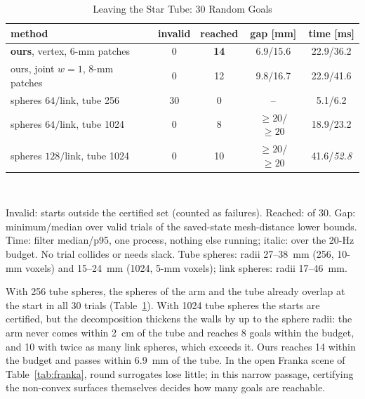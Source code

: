 \documentclass[journal]{IEEEtran}
\theoremstyle{definition}
\begin{document}
\begin{table}[t]
\caption{Leaving the Star Tube: 30 Random Goals}
\label{tab:spheres}
\centering\footnotesize
\setlength{\tabcolsep}{2pt}
\begin{tabular}{lcccc}
\toprule
method & invalid & reached & gap [mm] & time [ms]\\
\midrule
\textbf{ours}, vertex, 6-mm patches & 0 & \textbf{14} & 6.9/15.6 & 22.9/36.2\\
ours, joint $w=1$, 8-mm patches & 0 & 12 & 9.8/16.7 & 22.9/41.6\\
spheres $64/$link, tube 256 & 30 & 0 & -- & 5.1/6.2\\
spheres $64/$link, tube 1024 & 0 & 8 & $\ge20$/$\ge20$ & 18.9/23.2\\
spheres $128/$link, tube 1024 & 0 & 10 & $\ge20$/$\ge20$ & 41.6/\textit{52.8}\\
\bottomrule
\end{tabular}
\\[3pt]
\parbox{\columnwidth}{\footnotesize Invalid: starts outside the certified set (counted as failures).
Reached: of 30. Gap: minimum/median over valid trials of the saved-state mesh-distance lower bounds.
Time: filter median/p95, one process, nothing else running; italic: over the 20-Hz budget. No trial
collides or needs slack. Tube spheres: radii 27--38~mm (256, 10-mm voxels) and 15--24~mm (1024, 5-mm
voxels); link spheres: radii 17--46~mm.}
\end{table}

With 256 tube spheres, the spheres of the arm and the tube already overlap at the start in all 30
trials (Table~\ref{tab:spheres}). With 1024 tube spheres the starts are certified, but the
decomposition thickens the walls by up to the sphere radii: the arm never comes within 2~cm of the
tube and reaches 8 goals within the budget, and 10 with twice as many link spheres, which exceeds it.
Ours reaches 14 within the budget and passes within 6.9~mm of the tube. In the open Franka scene of
Table~\ref{tab:franka}, round surrogates lose little; in this narrow passage, certifying the
non-convex surfaces themselves decides how many goals are reachable.

\end{document}
